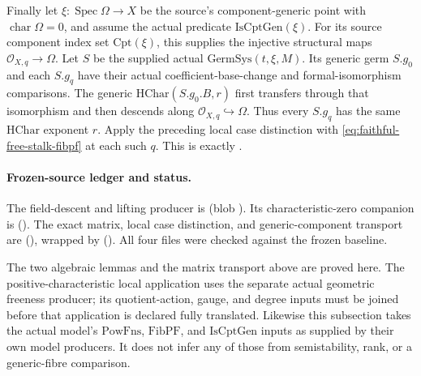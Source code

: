 Finally let \(\xi:\operatorname{Spec}\Omega\to X\) be the
source's component-generic point with \(\operatorname{char}\Omega=0\),
and assume the actual predicate \(\mathrm{IsCptGen}(\xi)\).
For its source component index set \(\mathrm{Cpt}(\xi)\),
this supplies the injective structural maps
\(\mathcal O_{X,q}\to\Omega\).
Let \(S\) be the supplied actual \(\mathrm{GermSys}(t,\xi,M)\).
Its generic germ \(S.g_0\) and each \(S.g_q\) have their actual
coefficient-base-change and formal-isomorphism comparisons.
The generic \(\mathrm{HChar}(S.g_0.B,r)\) first transfers through
that isomorphism and then descends along
\(\mathcal O_{X,q}\hookrightarrow\Omega\).
Thus every \(S.g_q\) has the same \(\mathrm{HChar}\) exponent \(r\).
Apply the preceding local case distinction with
\eqref{eq:faithful-free-stalk-fibpf} at each such \(q\).
This is exactly
.

\paragraph{Frozen-source ledger and status.}
The field-descent and lifting producer is
\href{https://github.com/ChristianKudeba/alpoge-rh-verification/blob/alpoge-source-7cbf7a0c/src/Development/WeilBound/CoreStatements/TorusUniformisation/ChowMahlerFamilies/FreeModuleNakayamaDescent.lean}
{}
(blob ).
Its characteristic-zero companion is
\href{https://github.com/ChristianKudeba/alpoge-rh-verification/blob/alpoge-source-7cbf7a0c/src/Development/WeilBound/CoreStatements/TorusUniformisation/ChowMahlerFamilies/CharZeroFreeModule.lean}
{}
().
The exact matrix, local case distinction, and generic-component
transport are
\href{https://github.com/ChristianKudeba/alpoge-rh-verification/blob/alpoge-source-7cbf7a0c/src/Development/WeilBound/CoreStatements/TorusUniformisation/ChowMahlerFamilies/HodgeFreeEveryStalk.lean}
{}
(),
wrapped by
\href{https://github.com/ChristianKudeba/alpoge-rh-verification/blob/alpoge-source-7cbf7a0c/src/Development/AutomorphicSpectrum/Proofs/GeometryProofs/GermSystemHeightFree.lean}
{}
().
All four files were checked against the frozen baseline.

The two algebraic lemmas and the matrix transport above are
proved here.  The positive-characteristic local application
uses the separate actual geometric freeness producer; its
quotient-action, gauge, and degree inputs must be joined before
that application is declared fully translated.
Likewise this subsection takes the actual model's
\(\mathrm{PowFns}\), \(\mathrm{FibPF}\), and
\(\mathrm{IsCptGen}\) inputs as supplied by their own model
producers.  It does not infer any of those from semistability,
rank, or a generic-fibre comparison.
